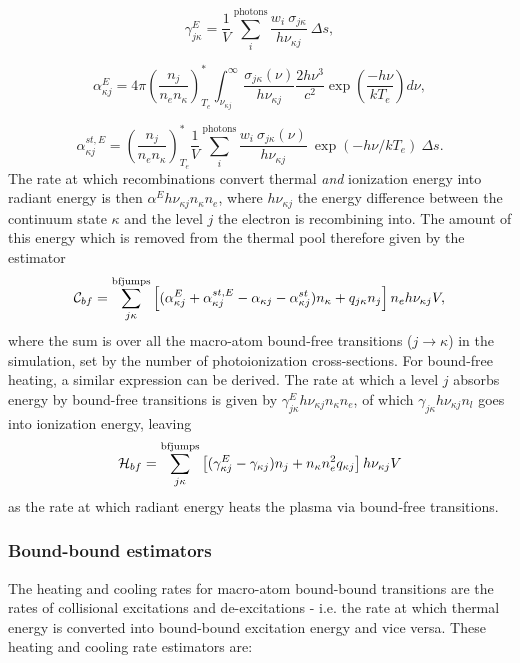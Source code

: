 \begin{equation}
\gamma^E_{j\kappa} = \frac{1}{V} \sum_i^{\mathrm{photons}} 
\frac{w_i~\sigma_{j\kappa}}{h \nu_{\kappa j}}~\Delta s, 
\end{equation}

\begin{equation}
\alpha^E_{\kappa j} = 4\pi \left( \frac{n_j}{n_e n_\kappa} \right)^*_{T_e}
 \int^\infty_{\nu_{\kappa j}} 
\frac{\sigma_{j \kappa}(\nu)}{h \nu_{\kappa j}} \frac{2 h \nu^3}{c^2} 
\exp \left( \frac{- h \nu}{k T_e} \right) d\nu,
\end{equation}

\begin{equation}
\alpha_{\kappa j}^{st,E} = \left( \frac{n_j}{n_e n_\kappa} \right)^*_{T_e}
\frac{1}{V} \sum_i^{\mathrm{photons}}
\frac{w_i~\sigma_{j\kappa}({\nu})}{h \nu_{\kappa j}}
~\exp(-h\nu/kT_e)~\Delta s.
\end{equation}
The rate at which recombinations convert
thermal {\em and} ionization energy into radiant energy is then
$\alpha^E h\nu_{\kappa j} n_\kappa n_e$, where $h \nu_{\kappa j}$
the energy difference between the continuum state $\kappa$ and 
the level $j$ the electron is recombining into. 
The amount of this energy which is removed from the thermal pool
therefore given by the estimator
\begin{equation}
{\cal C}_{bf} = \sum_{j\kappa}^{\mathrm{bfjumps}} 
\left[ (\alpha^E_{\kappa j} + \alpha^{st,E}_{\kappa j} - \alpha_{\kappa j} - \alpha^{st}_{\kappa j}) 
n_{\kappa} + 
q_{j\kappa} n_j \right]
n_e h\nu_{\kappa j} V,
\end{equation}
where the sum is over all the macro-atom bound-free transitions ($j\rightarrow\kappa$) 
in the simulation, set by
the number of photoionization cross-sections. 
For bound-free heating, a similar expression can be derived. The rate at which
a level $j$ absorbs energy by bound-free 
transitions is given by $\gamma^E_{j\kappa} h\nu_{\kappa j} n_\kappa n_e$,
of which $\gamma_{j\kappa} h \nu_{\kappa j} n_l$ goes into ionization energy, leaving 
\begin{equation}
{\cal H}_{bf} = \sum_{j\kappa}^{\mathrm{bfjumps}} \left[ (\gamma^E_{\kappa j} - \gamma_{\kappa j}) n_j + n_\kappa n_e^2 q_{\kappa j} \right] h \nu_{\kappa j} V
\end{equation}
as the rate at which radiant energy heats the plasma via bound-free transitions.


\subsubsection{Bound-bound estimators}
The heating and cooling rates for macro-atom bound-bound transitions are the rates of
collisional excitations and de-excitations
- i.e. the rate at which thermal energy is converted into
bound-bound excitation energy and vice versa.
These heating and cooling rate estimators are:

